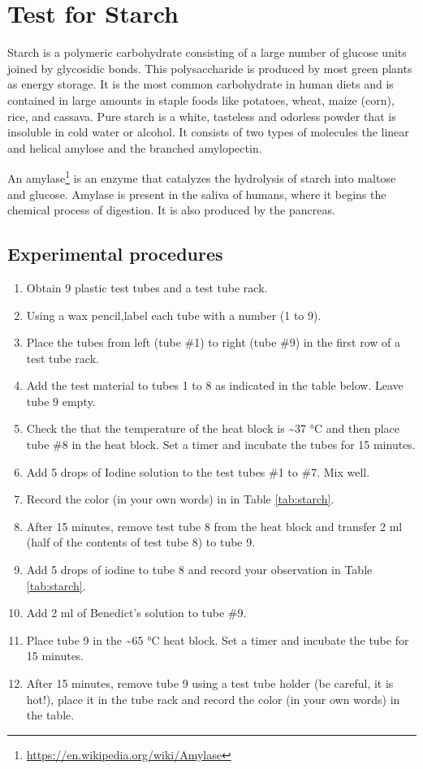 \documentclass[]{book}
\providecommand{\tightlist}{%
  \setlength{\itemsep}{0pt}\setlength{\parskip}{0pt}}
\let\rmarkdownfootnote\footnote%
\def\footnote{\protect\rmarkdownfootnote}
\renewcommand{\href}[2]{#2\footnote{\url{#1}}}
\theoremstyle{definition}
\theoremstyle{definition}
\theoremstyle{definition}
\theoremstyle{remark}
\begin{document}
\section{Test for Starch}\label{test-for-starch}

Starch is a polymeric carbohydrate consisting of a large number of
glucose units joined by glycosidic bonds. This polysaccharide is
produced by most green plants as energy storage. It is the most common
carbohydrate in human diets and is contained in large amounts in staple
foods like potatoes, wheat, maize (corn), rice, and cassava. Pure starch
is a white, tasteless and odorless powder that is insoluble in cold
water or alcohol. It consists of two types of molecules the linear and
helical amylose and the branched amylopectin.

An \href{https://en.wikipedia.org/wiki/Amylase}{amylase} is an enzyme
that catalyzes the hydrolysis of starch into maltose and glucose.
Amylase is present in the saliva of humans, where it begins the chemical
process of digestion. It is also produced by the pancreas.

\subsection{Experimental procedures}\label{experimental-procedures-2}

\begin{enumerate}
\def\labelenumi{\arabic{enumi}.}
\tightlist
\item
  Obtain 9 plastic test tubes and a test tube rack.
\item
  Using a wax pencil,label each tube with a number (1 to 9).
\item
  Place the tubes from left (tube \#1) to right (tube \#9) in the first
  row of a test tube rack.
\item
  Add the test material to tubes 1 to 8 as indicated in the table below.
  Leave tube 9 empty.
\item
  Check the that the temperature of the heat block is
  \textasciitilde{}37 °C and then place tube \#8 in the heat block. Set
  a timer and incubate the tubes for 15 minutes.
\item
  Add 5 drops of Iodine solution to the test tubes \#1 to \#7. Mix well.
\item
  Record the color (in your own words) in in Table \ref{tab:starch}.
\item
  After 15 minutes, remove test tube 8 from the heat block and transfer
  2 ml (half of the contents of test tube 8) to tube 9.
\item
  Add 5 drops of iodine to tube 8 and record your observation in Table
  \ref{tab:starch}.
\item
  Add 2 ml of Benedict's solution to tube \#9.
\item
  Place tube 9 in the \textasciitilde{}65 °C heat block. Set a timer and
  incubate the tube for 15 minutes.
\item
  After 15 minutes, remove tube 9 using a test tube holder (be careful,
  it is hot!), place it in the tube rack and record the color (in your
  own words) in the table.
\end{enumerate}
\end{document}
